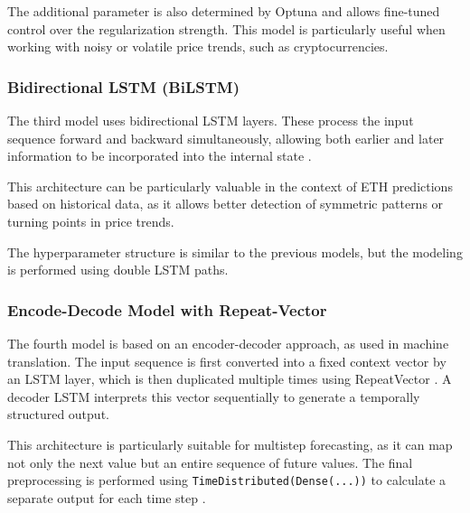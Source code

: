The additional parameter is also determined by Optuna and allows fine-tuned control over the regularization strength.
This model is particularly useful when working with noisy or volatile price trends, such as cryptocurrencies.



\subsubsection{Bidirectional LSTM (BiLSTM)}

The third model uses bidirectional LSTM layers.
These process the input sequence forward and backward simultaneously, allowing both earlier and later information to be incorporated into the internal state \cite{bi-lstm}.

This architecture can be particularly valuable in the context of ETH predictions based on historical data, as it allows better detection of symmetric patterns or turning points in price trends.

The hyperparameter structure is similar to the previous models, but the modeling is performed using double LSTM paths.



\subsubsection{Encode-Decode Model with Repeat-Vector}

The fourth model is based on an encoder-decoder approach, as used in machine translation.
The input sequence is first converted into a fixed context vector by an LSTM layer, which is then duplicated multiple times using RepeatVector \cite{keras-repeat-vector}.
A decoder LSTM interprets this vector sequentially to generate a temporally structured output.

This architecture is particularly suitable for multistep forecasting, as it can map not only the next value but an entire sequence of future values.
The final preprocessing is performed using \texttt{TimeDistributed(Dense(...))} to calculate a separate output for each time step \cite{keras-time-distributed}.



